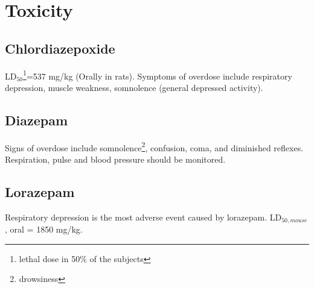 \chapter{Toxicity}
\section{Chlordiazepoxide}
LD$_{50}$\footnote{lethal dose in 50\% of the subjects}=537 mg/kg (Orally in rats). Symptoms of overdose include respiratory depression, muscle weakness, somnolence (general depressed activity).



\section{Diazepam}
Signs of overdose include somnolence\footnote{drowsiness}, confusion, coma, and diminished reflexes. Respiration, pulse and blood pressure should be monitored.


\section{Lorazepam} 
Respiratory depression is the most adverse event caused by lorazepam. LD$_{50, mouse}$, oral = 1850 mg/kg.
